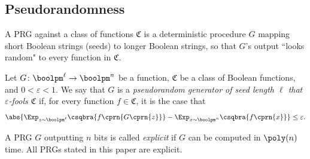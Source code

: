 \setcounter{theorem}{16}
	\subsection{Pseudorandomness}
	
	A PRG against a class of functions $\mathfrak{C}$ is a deterministic procedure $G$ mapping short Boolean strings (seeds) to longer Boolean strings, so that $G$'s output ``looks random" to every function in $\mathfrak{C}$.
	
    \begin{definition}
    	Let $G\colon\boolpm^{\ell}\to\boolpm^n$ be a function, $\mathfrak{C}$ be a class of Boolean functions, and $0<\varepsilon<1$. We say that $G$ is a \emph{pseudorandom generator of seed length $\ell$ that $\varepsilon$-fools $\mathfrak{C}$} if, for every function $f\in\mathfrak{C}$, it is the case that
    	\[
    	    \abs{\Exp_{z\sim\boolpm^\ell}\csqbra{f\cprn{G\cprn{z}}}-
    	    \Exp_{x\sim\boolpm^n}\csqbra{f\cprn{x}}}\leq\varepsilon.
    	\]
    \end{definition}
	
	A PRG $G$ outputting $n$ bits is called \emph{explicit} if $G$ can be computed in $\poly(n)$ time. All PRGs stated in this paper are explicit.
	
